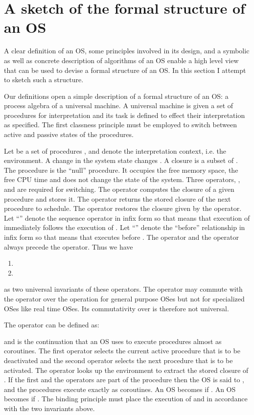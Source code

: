 \documentclass[draft]{article}
\begin{document}
\section{A sketch of the formal structure of an OS}
\label{sec:os:theory:sketch}

A clear definition  of an OS, some principles  involved in its design,
and a symbolic as well as  concrete description of algorithms of an OS
enable a high level view that can be used to devise a formal structure
of an OS.  In this section I attempt to sketch such a structure.

Our definitions open a simple  description of a formal structure of an
OS: a process algebra of  a universal machine.  A universal machine is
given a set  of procedures for interpretation and  its task is defined
to  effect their  interpretation  as specified.   The first  classness
principle must be employed to switch between active and passive states
of   the  procedures.   

Let  be a set of procedures  ,  and  denote the interpretation context, i.e. the environment.  A
change in the system state changes .  A closure is a subset of .
The procedure   is the ``null'' procedure.  It  occupies the free
memory space, the  free CPU time and does not change  the state of the
system.  Three  operators, ,   and    are  required  for
switching.   The   operator  computes the  closure  of a  given
procedure and  stores it.  The  operator  returns the stored
closure  of the  next procedure  to schedule.   The   operator
restores the  closure given by  the  operator.   Let ``''
denote the  sequence operator in  infix form so  that  means
that execution of   immediately follows the execution  of .  Let
``'' denote the ``before'' relationship  in infix form so that  means that   executes before .  The   operator and the
  operator always  precede the   operator.   Thus we
have
\begin{enumerate}
\item 
\item 
\end{enumerate}
as  two  universal  invariants  of these  operators.   The  
operator may commute with the   operator over the  operation
for general purpose  OSes but not for specialized  OSes like real time
OSes.  Its commutativity over  is therefore not universal.

The  operator can be defined as:

and is the  continuation that an OS uses  to execute procedures almost
as coroutines.   The first   operator selects the  current active
procedure    that is  to  be  deactivated  and the  second  
operator selects  the next  procedure  that  is to  be activated.
The   operator looks up  the environment  to  extract the
stored closure of .  If the first  and the  operators
are part of the procedure  then the OS is said to , and  the procedures execute exactly as  coroutines.  An OS
becomes  if .  An OS becomes
  if  .   The  binding
principle  must  place the  execution  of    and   in
accordance  with the  two invariants  above.  
\end{document}

